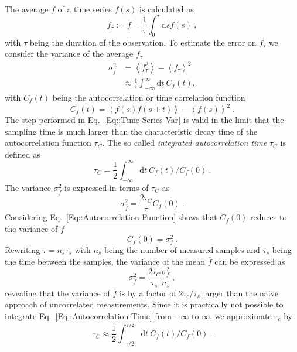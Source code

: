 	The average $\overline{f}$ of a time series $f(s)$ is calculated as
	\begin{equation}
		f_\tau := \overline{f} = 	\frac{1}{\tau} \int_0^{\tau} \text{d}s f(s) ~,
	\end{equation}
	with $\tau$ being the duration of the observation. To estimate the error on $f_\tau$ we consider the variance of the average $f_\tau$ \cite{frenkel2023understanding, anderson2011statistical}
	\begin{equation} \label{Eq::Time-Series-Var}
		\begin{split}
			\sigma_{\overline{f}}^2 &=	\left \langle f_\tau^2 \right \rangle - \left \langle f_\tau \right \rangle^2 \\
			&\approx \frac{1}{\tau} \int_{-\infty}^{\infty} \text{d}t~C_f(t),
		\end{split}
	\end{equation}
	with $C_f(t)$ being the autocorrelation or time correlation function
	\begin{equation} \label{Eq::Autocorrelation-Function}
		C_f(t) =	\left \langle f(s) f(s + t) \right \rangle - \left \langle f(s) \right \rangle^2~.
	\end{equation}
	The step performed in Eq.~\eqref{Eq::Time-Series-Var} is valid in the limit that the sampling time is much larger than the characteristic decay time of the autocorrelation function $\tau_C$. The so called \textit{integrated autocorrelation time} $\tau_C$ is defined as
	\begin{equation} \label{Eq::Autocorrelation-Time}
		\tau_C = \frac{1}{2}	\int_{-\infty}^{\infty} \text{d}t~C_f(t) /	C_f(0)~.
	\end{equation}
	The variance $\sigma_{\overline{f}}^2$ is expressed in terms of $\tau_C$ as
	\begin{equation}
		\sigma_{\overline{f}}^2 =	\frac{2\tau_C}{\tau} C_f(0)~.
	\end{equation}
	Considering Eq.~\eqref{Eq::Autocorrelation-Function} shows that $C_f(0)$ reduces to the variance of $f$
	\begin{equation}
		C_f(0) =	\sigma_f^2~.
	\end{equation}
	Rewriting $\tau =	n_s \tau_s$ with $n_s$ being the number of measured samples and $\tau_s$ being the time between the samples, the variance of the mean $\overline{f}$ can be expressed as
	\begin{equation}
		\sigma_{\overline{f}}^2 =	\frac{2 \tau_C}{\tau_s} \frac{\sigma_f^2}{n_s} ~,
	\end{equation}
	revealing that the variance of $\overline{f}$ is by a factor of ${2 \tau_c} /	{\tau_s}$ larger than the naive approach of uncorrelated measurements. Since it is practically not possible to integrate Eq.~\eqref{Eq::Autocorrelation-Time} from $-\infty$ to $\infty$,   we approximate $\tau_c$ by
	\begin{equation}
		\tau_C \approx \frac{1}{2} \int_{-\tau/2}^{\tau/2} \text{d}t~C_f(t) /	C_f(0)~.
	\end{equation}
	
